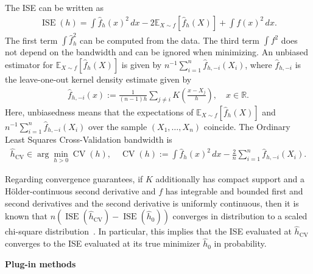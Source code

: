 The ISE can be written as
\begin{align*}
    \operatorname{ISE}(h)=\int\hat{f}_h(x)^2\,dx-2\mathbb{E}_{X\sim f}\left[\hat{f}_h(X)\right]+\int f(x)^2\,dx.
\end{align*}
The first term $\int\hat{f}_h^2$ can be computed from the data. The third term $\int f^2$ does not depend on the bandwidth and can be ignored when minimizing. An unbiased estimator for $\mathbb{E}_{X\sim f}[\hat{f}_h(X)]$ is given by $n^{-1}\sum_{i=1}^{n}\hat{f}_{h,-i}(X_i)$, where $\hat{f}_{h,-i}$ is the leave-one-out kernel density estimate given by
\begin{align*}
    \hat{f}_{h,-i}(x):=\frac{1}{(n-1)h}\sum_{j\ne i}K\left(\frac{x-X_j}{h}\right),\quad x\in\mathbb{R}.
\end{align*}
\begingroup
\setlength{\emergencystretch}{2em}
Here, unbiasedness means that the expectations of $\mathbb{E}_{X\sim f}[\hat{f}_h(X)]$ and $n^{-1}\allowbreak\sum_{i=1}^{n}\hat{f}_{h,-i}(X_i)$ over the sample $(X_1,\dots,X_n)$ coincide. The Ordinary Least Squares Cross-Validation bandwidth is
\begin{align*}
    \hat{h}_{\operatorname{CV}}\in\arg\min_{h>0}\operatorname{CV}(h),\quad\operatorname{CV}(h):=\int\hat{f}_h(x)^2\,dx-\frac{2}{n}\sum_{i=1}^{n}\hat{f}_{h,-i}(X_i).
\end{align*}
\par
\endgroup
\begingroup
\setlength{\emergencystretch}{1em}
Regarding convergence guarantees, if $K$ additionally has compact support and a Hölder-continuous second derivative and $f$ has integrable and bounded first and second derivatives and the second derivative is uniformly continuous, then it is known that $n(\operatorname{ISE}(\hat{h}_{\text{CV}})-\operatorname{ISE}(\hat{h}_0))$ converges in distribution to a scaled chi-square distribution~\cite[Theorem~2.2]{hall_extent_nodate}. In particular, this implies that the ISE evaluated at $\hat{h}_{\text{CV}}$ converges to the ISE evaluated at its true minimizer $\hat{h}_0$ in probability.
\par
\endgroup

\textbf{Plug-in methods}

